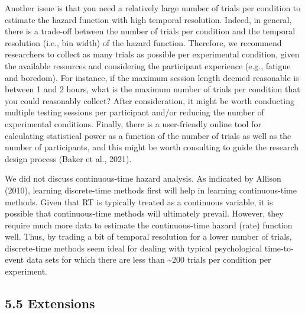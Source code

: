 \documentclass[
  man,floatsintext]{apa6}
\begin{document}
Another issue is that you need a relatively large number of trials per condition to estimate the hazard function with high temporal resolution. Indeed, in general, there is a trade-off between the number of trials per condition and the temporal resolution (i.e., bin width) of the hazard function. Therefore, we recommend researchers to collect as many trials as possible per experimental condition, given the available resources and considering the participant experience (e.g., fatigue and boredom). For instance, if the maximum session length deemed reasonable is between 1 and 2 hours, what is the maximum number of trials per condition that you could reasonably collect? After consideration, it might be worth conducting multiple testing sessions per participant and/or reducing the number of experimental conditions. Finally, there is a user-friendly online tool for calculating statistical power as a function of the number of trials as well as the number of participants, and this might be worth consulting to guide the research design process (Baker et al., 2021).

We did not discuss continuous-time hazard analysis. As indicated by Allison (2010), learning discrete-time methods first will help in learning continuous-time methods. Given that RT is typically treated as a continuous variable, it is possible that continuous-time methods will ultimately prevail. However, they require much more data to estimate the continuous-time hazard (rate) function well. Thus, by trading a bit of temporal resolution for a lower number of trials, discrete-time methods seem ideal for dealing with typical psychological time-to-event data sets for which there are less than \textasciitilde200 trials per condition per experiment.

\subsection{5.5 Extensions}\label{extensions}
\end{document}
